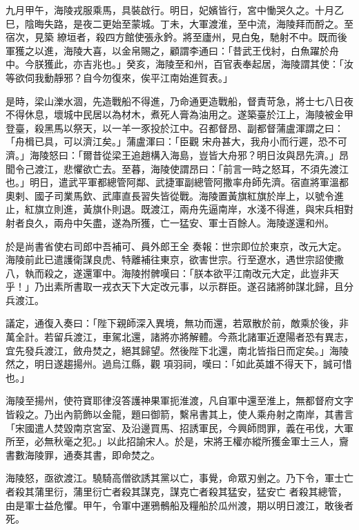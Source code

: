 \begin{pinyinscope}
 九月甲午，海陵戎服乘馬，具裝啟行。明日，妃嬪皆行，宮中慟哭久之。十月乙巳，陰晦失路，是夜二更始至蒙城。丁未，大軍渡淮，至中流，海陵拜而酹之。至宿次，見築
 繚垣者，殺四方館使張永鈐。將至廬州，見白兔，馳射不中。既而後軍獲之以進，海陵大喜，以金帛賜之，顧謂李通曰：「昔武王伐紂，白魚躍於舟中。今朕獲此，亦吉兆也。」癸亥，海陵至和州，百官表奉起居，海陵謂其使：「汝等欲伺我動靜邪？自今勿復來，俟平江南始進賀表。」



 是時，梁山濼水涸，先造戰船不得進，乃命通更造戰船，督責苛急，將士七八日夜不得休息，壞城中民居以為材木，煮死人膏為油用之。遂築臺於江上，海陵被金甲登臺，殺黑馬以祭天，以一羊一豕投於江中。召都督昂、副都督蒲盧渾謂之曰：「舟楫已具，可以濟江矣。」蒲盧渾曰：「臣觀
 宋舟甚大，我舟小而行遲，恐不可濟。」海陵怒曰：「爾昔從梁王追趙構入海島，豈皆大舟邪？明日汝與昂先濟。」昂聞令己渡江，悲懼欲亡去。至暮，海陵使謂昂曰：「前言一時之怒耳，不須先渡江也。」明日，遣武平軍都總管阿鄰、武捷軍副總管阿撒率舟師先濟。宿直將軍溫都奧剌、國子司業馬欽、武庫直長習失皆從戰。海陵置黃旗紅旗於岸上，以號令進止，紅旗立則進，黃旗仆則退。既渡江，兩舟先逼南岸，水淺不得進，與宋兵相對射者良久，兩舟中矢盡，遂為所獲，亡一猛安、軍士百餘人。海陵遂還和州。



 於是尚書省使右司郎中吾補可、員外郎王全
 奏報：世宗即位於東京，改元大定。海陵前此已遣護衛謀良虎、特離補往東京，欲害世宗。行至遼水，遇世宗詔使撒八，執而殺之，遂還軍中。海陵拊髀嘆曰：「朕本欲平江南改元大定，此豈非天乎！」乃出素所書取一戎衣天下大定改元事，以示群臣。遂召諸將帥謀北歸，且分兵渡江。



 議定，通復入奏曰：「陛下親師深入異境，無功而還，若眾散於前，敵乘於後，非萬全計。若留兵渡江，車駕北還，諸將亦將解體。今燕北諸軍近遼陽者恐有異志，宜先發兵渡江，斂舟焚之，絕其歸望。然後陛下北還，南北皆指日而定矣。」海陵然之，明日遂趨揚州。過烏江縣，觀
 項羽祠，嘆曰：「如此英雄不得天下，誠可惜也。」



 海陵至揚州，使符寶耶律沒答護神果軍扼淮渡，凡自軍中還至淮上，無都督府文字皆殺之。乃出內箭飾以金龍，題曰御箭，繫帛書其上，使人乘舟射之南岸，其書言「宋國遣人焚毀南京宮室、及沿邊買馬、招誘軍民，今興師問罪，義在弔伐，大軍所至，必無秋毫之犯。」以此招諭宋人。於是，宋將王權亦縱所獲金軍士三人，齎書數海陵罪，通奏其書，即命焚之。



 海陵怒，亟欲渡江。驍騎高僧欲誘其黨以亡，事覺，命眾刃剉之。乃下令，軍士亡者殺其蒲里衍，蒲里衍亡者殺其謀克，謀克亡者殺其猛安，猛安亡
 者殺其總管，由是軍士益危懼。甲午，令軍中運鴉鶻船及糧船於瓜州渡，期以明日渡江，敢後者死。




\end{pinyinscope}
